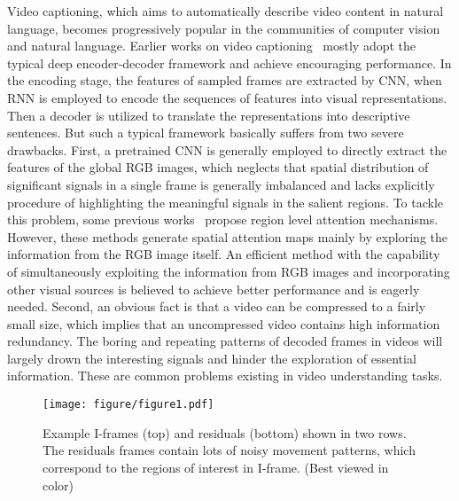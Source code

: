 \documentclass[a4paper,conference]{IEEEtran}
\begin{document}
Video captioning, which aims to automatically describe video content in natural language, becomes progressively popular in the communities of computer vision and natural language. Earlier works on video captioning~\cite{venugopalan2014translating,xu2017learning, wang2018reconstruction} mostly adopt the typical deep encoder-decoder framework and achieve encouraging performance. In the encoding stage, the features of sampled frames are extracted by CNN, when RNN is employed to encode the sequences of features into visual representations. Then a decoder is utilized to translate the representations into descriptive sentences. But such a typical framework basically suffers from two severe drawbacks. First, a pretrained CNN is generally employed to directly extract the features of the global RGB images, which neglects that spatial distribution of significant signals in a single frame is generally imbalanced and lacks explicitly procedure of highlighting the meaningful signals in the salient regions. To tackle this problem, some previous works~\cite{wang2018spotting, tu2017video} propose region level attention mechanisms. However, these methods generate spatial attention maps mainly by exploring the information from the RGB image itself. An efficient method with the capability of simultaneously exploiting the information from RGB images and incorporating other visual sources is believed to achieve better performance and is eagerly needed. Second, an obvious fact is that a video can be compressed to a fairly small size, which implies that an uncompressed video contains high information redundancy. The boring and repeating patterns of decoded frames in videos will largely drown the interesting signals and hinder the exploration of essential information. These are common problems existing in video understanding tasks.
\begin{figure}[!t]
\texttt{[image: figure/figure1.pdf]}
\caption{Example I-frames (top) and residuals (bottom) shown in two rows. The residuals frames contain lots of noisy movement patterns, which correspond to the regions of interest in I-frame. (Best viewed in color)}
\label{fig:motivation}
\end{figure}
\end{document}
